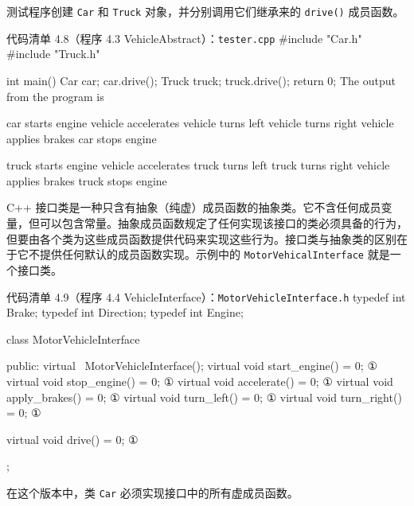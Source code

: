 测试程序创建 \texttt{Car} 和 \texttt{Truck} 对象，并分别调用它们继承来的 \texttt{drive()} 成员函数。

\begin{codeboxt}{代码清单 4.8（程序 4.3 VehicleAbstract）：\texttt{tester.\allowbreak{}cpp}}
#include "Car.h"
#include "Truck.h"

int main()
{
    Car car;
    car.drive();
    Truck truck;
    truck.drive();
    return 0;
}
The output from the program is

car starts engine
vehicle accelerates
vehicle turns left
vehicle turns right
vehicle applies brakes
car stops engine

truck starts engine
vehicle accelerates
truck turns left
truck turns right
vehicle applies brakes
truck stops engine
\end{codeboxt}

C++ 接口类是一种只含有抽象（纯虚）成员函数的抽象类。它不含任何成员变量，但可以包含常量。抽象成员函数规定了任何实现该接口的类必须具备的行为，但要由各个类为这些成员函数提供代码来实现这些行为。接口类与抽象类的区别在于它不提供任何默认的成员函数实现。示例中的 \texttt{Motor\allowbreak{}Vehical\allowbreak{}Interface} 就是一个接口类。

\begin{codeboxt}{代码清单 4.9（程序 4.4 VehicleInterface）：\texttt{Motor\allowbreak{}Vehicle\allowbreak{}Interface.\allowbreak{}h}}
typedef int Brake;
typedef int Direction;
typedef int Engine;

class MotorVehicleInterface
{
public:
    virtual ~MotorVehicleInterface();
    virtual void start_engine() = 0;     ①
    virtual void stop_engine() = 0;      ①
    virtual void accelerate() = 0;       ①
    virtual void apply_brakes() = 0;     ①
    virtual void turn_left() = 0;        ①
    virtual void turn_right() = 0;       ①

    virtual void drive() = 0;            ①
};
\end{codeboxt}
\par

在这个版本中，类 \texttt{Car} 必须实现接口中的所有虚成员函数。

